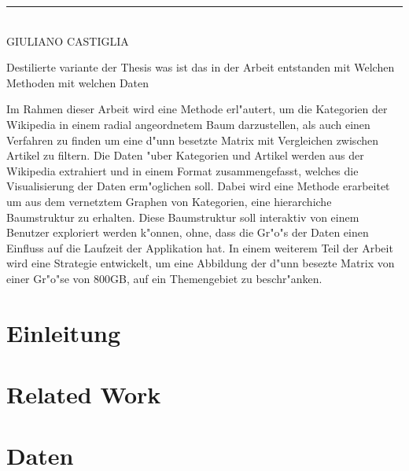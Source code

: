 \vspace{1cm}
\noindent\rule{5cm}{0.4pt}\\
GIULIANO CASTIGLIA

\clearpage


Destilierte variante der Thesis
was ist das in der Arbeit entstanden
mit Welchen Methoden
mit welchen Daten

Im Rahmen dieser Arbeit wird eine Methode erl"autert, um die Kategorien der Wikipedia in einem radial angeordnetem Baum darzustellen, als auch einen Verfahren zu finden um eine d"unn besetzte Matrix mit Vergleichen zwischen Artikel zu filtern.
Die Daten "uber Kategorien und Artikel werden aus der Wikipedia extrahiert und in einem Format zusammengefasst, welches die Visualisierung der Daten erm"oglichen soll.
Dabei wird eine Methode erarbeitet um aus dem vernetztem Graphen von Kategorien, eine hierarchiche Baumstruktur zu erhalten.
Diese Baumstruktur soll interaktiv von einem Benutzer exploriert werden k"onnen, ohne, dass die Gr"o"s der Daten einen Einfluss auf die Laufzeit der Applikation hat.
In einem weiterem Teil der Arbeit wird eine Strategie entwickelt, um eine Abbildung der d"unn besezte Matrix von einer Gr"o"se von 800GB, auf ein Themengebiet zu beschr"anken.



\tableofcontents



\cleardoublepage
{} %


\chapter{Einleitung}
\label{chap:einleitung}


\chapter{Related Work}
\label{chap:related_work}


\chapter{Daten}
\label{chap:daten}


